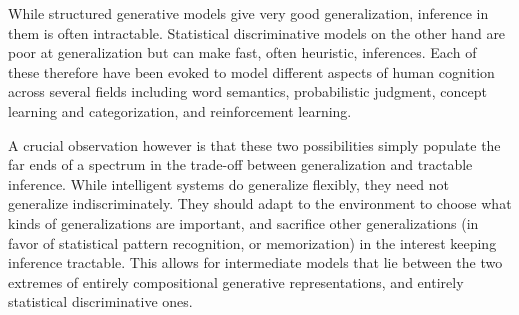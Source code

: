 
While structured generative models give very good generalization, inference in them is often intractable. Statistical discriminative models on the other hand are poor at generalization but can make fast, often heuristic, inferences. Each of these therefore have been evoked to model different aspects of human cognition across several fields including word semantics\cite{steyvers2007probabilistic, rogers2004semantic, gleitman1990structural}, probabilistic judgment\citep{oaksford2007bayesian, tversky1974judgment}, concept learning and categorization\citep{bruner2017study, medin1978context, shepard1987toward}, and reinforcement learning\citep{gershman2014retrospective, daw2011model, kool2017cost}. 

A crucial observation however is that these two possibilities simply populate the far ends of a spectrum in the trade-off between generalization and tractable inference. While intelligent systems do generalize flexibly, they need not generalize indiscriminately. They should adapt to the environment to choose what kinds of generalizations are important, and sacrifice other generalizations (in favor of statistical pattern recognition, or memorization) in the interest keeping inference tractable. This allows for intermediate models that lie between the two extremes of entirely compositional generative representations, and entirely statistical discriminative ones. 

